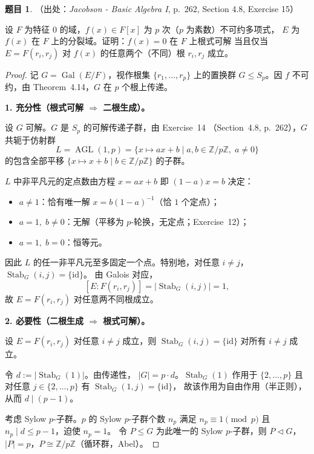 \documentclass[a4paper]{ctexart}
\theoremstyle{definition}
\newtheorem{example}{题目}[section]
\theoremstyle{analysis}
\theoremstyle{plain}
\begin{document}
\begin{example}
（出处：\textit{Jacobson - Basic Algebra I}, p.~262, Section 4.8, Exercise 15）

设 \(F\) 为特征 \(0\) 的域，\(f(x)\in F[x]\) 为 \(p\) 次（\(p\) 为素数）不可约多项式，
\(E\) 为 \(f(x)\) 在 \(F\) 上的分裂域。证明：\(f(x)=0\) 在 \(F\) 上根式可解
当且仅当 \(E=F(r_i,r_j)\) 对 \(f(x)\) 的任意两个（不同）根 \(r_i,r_j\) 成立。

\begin{proof}
记 \(G=\operatorname{Gal}(E/F)\)，视作根集 \(\{r_1,\dots,r_p\}\) 上的置换群
\(G\le S_p\)。因 \(f\) 不可约，由 Theorem~4.14，\(G\) 在 \(p\) 个根上传递。

\textbf{1. 充分性（根式可解 \(\Longrightarrow\) 二根生成）。}

设 \(G\) 可解。\(G\) 是 \(S_p\) 的可解传递子群，由 Exercise~14
（Section~4.8, p.~262），\(G\) 共轭于仿射群
\[
  L=\operatorname{AGL}(1,p)=\{x\mapsto ax+b\mid a,b\in\mathbb Z/p\mathbb Z,\;a\neq0\}
\]
的包含全部平移 \(\{x\mapsto x+b\mid b\in\mathbb Z/p\mathbb Z\}\) 的子群。

\(L\) 中非平凡元的定点数由方程 \(x=ax+b\) 即 \((1-a)x=b\) 决定：
\begin{itemize}
  \item \(a\neq1\)：恰有唯一解 \(x=b(1-a)^{-1}\)（恰 \(1\) 个定点）；
  \item \(a=1,\;b\neq0\)：无解（平移为 \(p\)-轮换，无定点；Exercise~12）；
  \item \(a=1,\;b=0\)：恒等元。
\end{itemize}
因此 \(L\) 的任一非平凡元至多固定一个点。特别地，对任意 \(i\neq j\)，
\(\operatorname{Stab}_G(i,j)=\{\mathrm{id}\}\)。
由 Galois 对应，
\[
  [E:F(r_i,r_j)]=|\!\operatorname{Stab}_G(i,j)|=1,
\]
故 \(E=F(r_i,r_j)\) 对任意两不同根成立。

\textbf{2. 必要性（二根生成 \(\Longrightarrow\) 根式可解）。}

设 \(E=F(r_i,r_j)\) 对任意 \(i\neq j\) 成立，则
\(\operatorname{Stab}_G(i,j)=\{\mathrm{id}\}\) 对所有 \(i\neq j\) 成立。

令 \(d:=|\!\operatorname{Stab}_G(1)|\)。由传递性，
\(|G|=p\cdot d\)。\(\operatorname{Stab}_G(1)\) 作用于 \(\{2,\dots,p\}\)
且对任意 \(j\in\{2,\dots,p\}\) 有 \(\operatorname{Stab}_G(1,j)=\{\mathrm{id}\}\)，
故该作用为自由作用（半正则），从而 \(d\mid(p-1)\)。

考虑 Sylow \(p\)-子群。\(p\) 的 Sylow \(p\)-子群个数 \(n_p\) 满足
\(n_p\equiv1\pmod p\) 且 \(n_p\mid d\le p-1\)，迫使 \(n_p=1\)。
令 \(P\le G\) 为此唯一的 Sylow \(p\)-子群，则
\(P\triangleleft G\)，\(|P|=p\)，\(P\cong\mathbb Z/p\mathbb Z\)（循环群，Abel）。


\end{proof}
\end{example}
\end{document}
